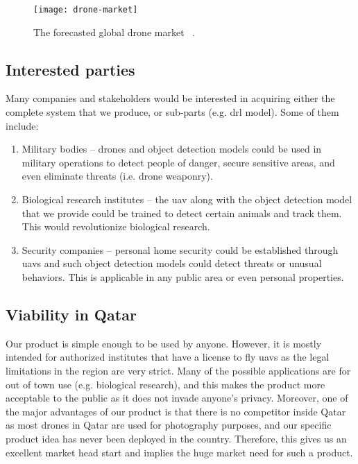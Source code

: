 \documentclass[../main.tex]{subfiles}
\begin{document}
\begin{figure}[tbp] 
        \centering
        \texttt{[image: drone-market]}
        \caption[The forecasted global drone market.]
        {The forecasted global drone market~%
        \cite[Fig.~2]{Mic14}.} 
        \label{fig:drone-market} 
\end{figure}
	
\subsection{Interested parties}
	Many companies and stakeholders would be interested in acquiring either the
	complete system that we produce, or sub-parts (e.g. \gls{drl} model). Some of them include:
	\begin{enumerate}
		\item Military bodies -- drones and object detection models could 
		be used in military operations to detect people of danger, secure 
		sensitive areas, and even eliminate threats (i.e. drone weaponry).
		
		\item Biological research institutes -- 
                    the \gls{uav} along with the object
		detection model that we provide could be trained to detect certain animals 
		and track them. This would revolutionize biological research.
		
		\item Security companies -- personal home security could be established through
		\glspl{uav} and such object detection models could detect threats or unusual
		behaviors. This is applicable in any public area or even personal properties.		
		
	\end{enumerate}

\subsection{Viability in Qatar}
	Our product is simple enough to be used by anyone. However, it is mostly intended for 
	authorized institutes that have a license to fly \glspl{uav} as the legal limitations 
	in the region are very strict. 
	Many of the possible applications are for out of town use (e.g. biological research), 
	and this makes the product more acceptable to the public as it does not invade anyone's privacy.
	Moreover, one of the major advantages of our product is that there is no competitor 
	inside Qatar as most drones in Qatar are used for photography purposes, and our
	specific product idea has never been deployed in the country. Therefore, this gives us an excellent 
	market head start and implies the huge market need for such a product.
\end{document}
